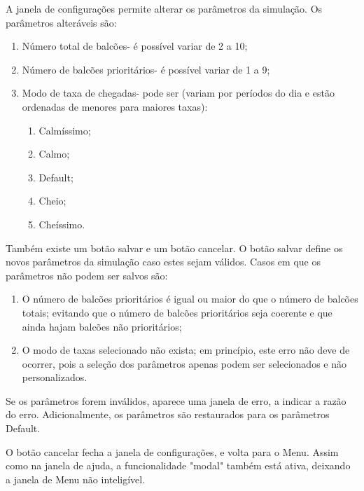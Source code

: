 \documentclass[12pt,a4paper]{article} %
\begin{document}
    A janela de configurações permite alterar os parâmetros da simulação. Os parâmetros alteráveis são:
    \begin{enumerate}
        \item Número total de balcões- é possível variar de 2 a 10;
        \item Número de balcões prioritários- é possível variar de 1 a 9;
        \item Modo de taxa de chegadas- pode ser (variam por períodos do dia e estão ordenadas de menores para maiores taxas):                                                       \begin{enumerate}
                                                     \item[1.1] Calmíssimo;
                                                     \item[1.2] Calmo;
                                                     \item[1.3] Default;
                                                     \item[1.4] Cheio;
                                                     \item[1.5] Cheíssimo.
                                                \end{enumerate}

    \end{enumerate}

    \medskip
    Também existe um botão salvar e um botão cancelar. O botão salvar define os novos parâmetros da simulação caso estes sejam válidos. Casos em que os parâmetros não podem ser salvos são:
    \begin{enumerate}
        \item O número de balcões prioritários é igual ou maior do que o número de balcões totais; evitando que o número de balcões prioritários seja coerente e que ainda hajam balcões não prioritários;
        \item O modo de taxas selecionado não exista; em princípio, este erro não deve de ocorrer, pois a seleção dos parâmetros apenas podem ser selecionados e não personalizados.
    \end{enumerate}

    \medskip
    Se os parâmetros forem inválidos, aparece uma janela de erro, a indicar a razão do erro. Adicionalmente, os parâmetros são restaurados para os parâmetros Default.

    \medskip
    O botão cancelar fecha a janela de configurações, e volta para o Menu. Assim como na janela de ajuda, a funcionalidade "modal" também está ativa, deixando a janela de Menu não inteligível.
\end{document}
